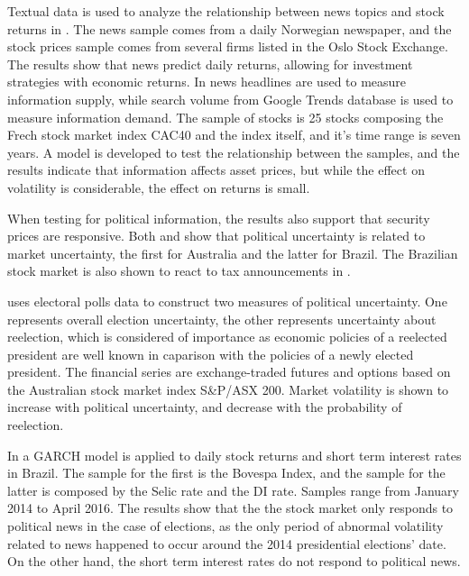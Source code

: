 \documentclass[cic,tc, english]{iiufrgs}
\begin{document}
    Textual data is used to analyze the relationship between news topics and stock returns in \citet{larsenthorsrud2017}. The news sample comes from a daily Norwegian newspaper, and the stock prices sample comes from several firms listed in the Oslo Stock Exchange. The results show that news predict daily returns, allowing for investment strategies with economic returns.
    In \citet{moussaetal2017} news headlines are used to measure information supply, while search volume from Google Trends database is used to measure information demand. The sample of stocks is 25 stocks composing the Frech stock market index CAC40 and the index itself, and it's time range is seven years. A model is developed to test the relationship between the samples, and the results indicate that information affects asset prices, but while the effect on volatility is considerable, the effect on returns is small.

    When testing for political information, the results also support that security prices are responsive. Both \citet{smales2015} and \citet{marquessantos2016} show that political uncertainty is related to market uncertainty, the first for Australia and the latter for Brazil. The Brazilian stock market is also shown to react to tax announcements in \citet{gabrielribeiro2013}.

    \citet{smales2015} uses electoral polls data to construct two measures of political uncertainty. One represents overall election uncertainty, the other represents uncertainty about reelection, which is considered of importance as economic policies of a reelected president are well known in caparison with the policies of a newly elected president. The financial series are exchange-traded futures and options based on the Australian stock market index S\&P/ASX 200. Market volatility is shown to increase with political uncertainty, and decrease with the probability of reelection.
    
    In \citet{marquessantos2016} a GARCH model is applied to daily stock returns and short term interest rates in Brazil. The sample for the first is the Bovespa Index, and the sample for the latter is composed by the Selic rate and the DI rate. Samples range from January 2014 to April 2016. The results show that the the stock market only responds to political news in the case of elections, as the only period of abnormal volatility related to news happened to occur around the 2014 presidential elections' date. On the other hand, the short term interest rates do not respond to political news.
    
\end{document}
